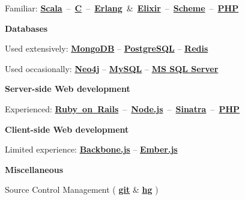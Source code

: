 \documentclass{tccv}
\begin{document}
{{\hspace{2pt}%
Familiar:
\mbox{\href{http://www.scala-lang.org}{\bf Scala} -- %
     \href{https://en.wikipedia.org/wiki/C_(programming_language)}{\bf C} -- %
     \href{http://www.erlang.org}{\bf Erlang} \& %
     \href{http://elixir-lang.org}{\bf Elixir} --  %
     \href{http://schemers.org}{\bf Scheme} -- %
     \href{http://php.net}{\bf PHP}%
}



\vspace{9pt}%
\hspace{-1pt}%
\textsf{\textbf{Databases}}
	 
\hspace{2pt}%
Used extensively: %
     \href{http://www.mongodb.org}{\bf MongoDB} -- %
     \href{http://www.postgresql.org}{\bf PostgreSQL} -- %
     \href{http://redis.io}{\bf Redis}%

\hspace{2pt}%
Used occasionally: %
     \href{http://www.neo4j.org}{\bf Neo4j} -- %
     \href{http://www.mysql.com}{\bf MySQL} -- %
     \href{http://www.microsoft.com/en-us/sqlserver/default.aspx}{\bf MS SQL Server}%



\vspace{9pt}%
\hspace{-1pt}%
\textsf{\textbf{Server-side Web development}}
 
\hspace{2pt}%
Experienced: %
\mbox{\href{http://rubyonrails.org}{\bf Ruby on Rails} -- %
     \href{http://nodejs.org}{\bf Node.js} -- %
     \href{http://www.sinatrarb.com}{\bf Sinatra} -- %
     \href{http://php.net}{\bf PHP}%
}



\vspace{9pt}%
\hspace{-1pt}%
\textsf{\textbf{Client-side Web development}}
	 
\hspace{2pt}%
Limited experience: %
     \href{http://backbonejs.org}{\bf Backbone.js} -- %
     \href{http://emberjs.com}{\bf Ember.js}%



\vspace{9pt}%
\hspace{-1pt}%
\textsf{\textbf{Miscellaneous}}

\hspace{2pt}%
Source Control Management (%
	\href{http://git-scm.com}{\bf git} \& %
	\href{http://www.selenic.com/mercurial/}{\bf hg}%
)%

}}
\end{document}
